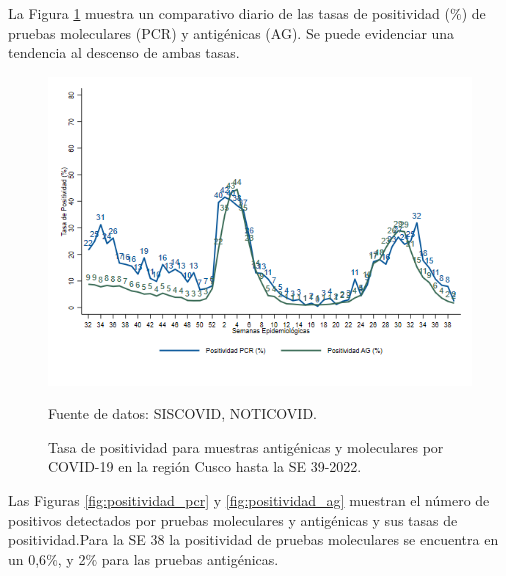 \documentclass[12pt,a4paper,openany]{book}
\begin{document}
	\pagebreak
	
	
	La Figura \ref{fig:total_muestras_procesada} muestra un comparativo diario de las tasas de positividad ($\%$) de pruebas moleculares (PCR) y antigénicas (AG). Se puede evidenciar una tendencia al descenso de ambas tasas.
	
	\begin{figure}[h]
		\caption{Tasa de positividad para muestras antigénicas y moleculares por COVID-19 en la región Cusco hasta la SE 39-2022. }\label{fig:total_muestras_procesada}
		\begin{center}
			\includegraphics[width=0.80\linewidth]{../figuras/positividad_diaria_2021_2022.png}
		\end{center}
		{\footnotesize {Fuente de datos: SISCOVID, NOTICOVID.}}
	\end{figure}
	
	
	
	Las Figuras \ref{fig:positividad_pcr} y \ref{fig:positividad_ag} muestran el número de positivos detectados por pruebas moleculares y antigénicas y sus tasas de positividad.Para la SE 38 la positividad de pruebas moleculares se encuentra en un 0,6$\%$, y 2$\%$ para las pruebas antigénicas.
	
\end{document}
